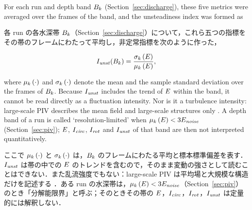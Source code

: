 \begin{en}[M5-4]
For each run and depth band $B_{k}$ (Section~\ref{sec:discharge}), these five metrics were averaged over the frames of the band, and the unsteadiness index was formed as
\end{en}
\begin{ja}
各 run の各水深帯 $B_{k}$（Section~\ref{sec:discharge}）について，これら五つの指標をその帯のフレームにわたって平均し，非定常指標を次のように作った，
\end{ja}
\begin{equation}
I_{\mathit{unst}}(B_{k}) = \frac{\sigma_{k}\left(E\right)}{\mu_{k}\left(E\right)} ,
\label{eq:Iunst}
\end{equation}
\begin{en}
where $\mu_{k}\left(\cdot\right)$ and $\sigma_{k}\left(\cdot\right)$ denote the mean and the sample standard deviation over the frames of $B_{k}$. Because $I_{\mathit{unst}}$ includes the trend of $E$ within the band, it cannot be read directly as a fluctuation intensity. Nor is it a turbulence intensity: large-scale PIV describes the mean field and large-scale structures only \citep{fujitaLargescaleParticleImage1998a}. A depth band of a run is called `resolution-limited' when $\mu_{k}\left(E\right) < 3E_{\mathit{noise}}$ (Section~\ref{sec:piv}); $E$, $I_{\mathit{circ}}$, $I_{\mathit{rot}}$ and $I_{\mathit{unst}}$ of that band are then not interpreted quantitatively.
\end{en}
\begin{ja}
ここで $\mu_{k}\left(\cdot\right)$ と $\sigma_{k}\left(\cdot\right)$ は，$B_{k}$ のフレームにわたる平均と標本標準偏差を表す．$I_{\mathit{unst}}$ は帯の中での $E$ のトレンドを含むので，そのまま変動の強さとして読むことはできない．また乱流強度でもない：large-scale PIV は平均場と大規模な構造だけを記述する \citep{fujitaLargescaleParticleImage1998a}．ある run の水深帯は，$\mu_{k}\left(E\right) < 3E_{\mathit{noise}}$（Section~\ref{sec:piv}）のとき「分解能限界」と呼ぶ；そのときその帯の $E$，$I_{\mathit{circ}}$，$I_{\mathit{rot}}$，$I_{\mathit{unst}}$ は定量的には解釈しない．
\end{ja}

